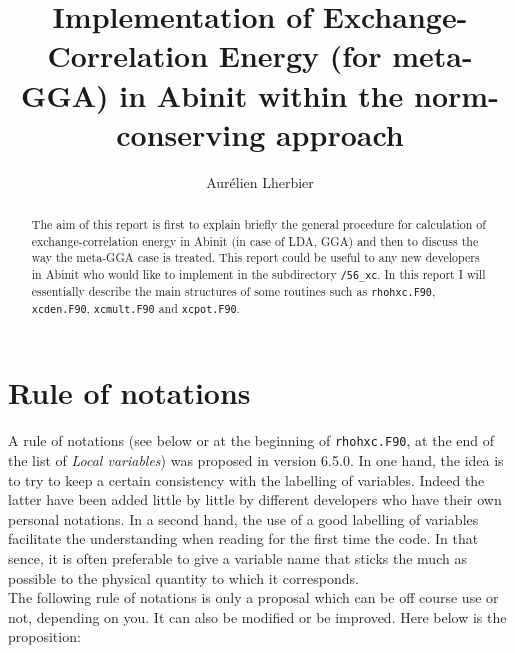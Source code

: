 \documentclass[a4paper,12pt]{report}
\title{Implementation of Exchange-Correlation Energy (for meta-GGA) in Abinit within the norm-conserving approach}
\author{Aur\'{e}lien Lherbier}
\begin{document}
\maketitle

\begin{abstract}
The aim of this report is first to explain briefly the general procedure for calculation of exchange-correlation energy in Abinit (in case of LDA, GGA) and then to discuss the way the meta-GGA case is treated. This report could be useful to any new developers in Abinit who would like to implement in the subdirectory \texttt{/56\_xc}. In this report I will essentially describe the main structures of some routines such as \texttt{rhohxc.F90}, \texttt{xcden.F90}, \texttt{xcmult.F90} and \texttt{xcpot.F90}.
\end{abstract}



\chapter{Rule of notations}

A rule of notations (see below or at the beginning of \texttt{rhohxc.F90}, at the end of the list of \textit{Local variables}) was proposed in version 6.5.0. In one hand, the idea is to try to keep a certain consistency with the labelling of variables. Indeed the latter have been added little by little by different developers who have their own personal notations. In a second hand, the use of a good labelling of variables facilitate the understanding when reading for the first time the code. In that sence, it is often preferable to give a variable name that sticks the much as possible to the physical quantity to which it corresponds.\\
The following rule of notations is only a proposal which can be off course use or not, depending on you. It can also be modified or be improved.
Here below is the proposition:\\
\end{document}
